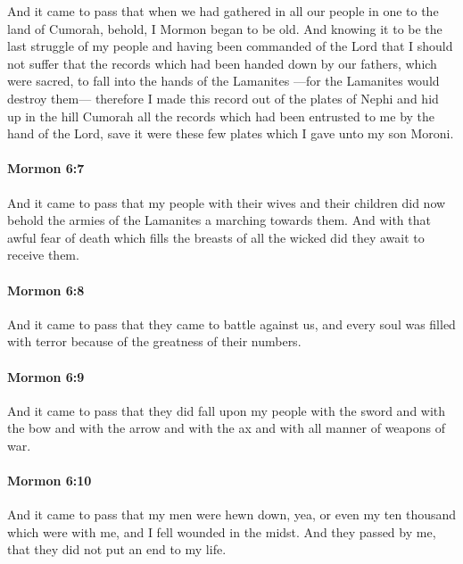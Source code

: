			And it came to pass that
			when we had gathered in all our people in one to the land of Cumorah,
			behold, I Mormon began to be old.
			And knowing it to be the last struggle of my people
			and having been commanded of the Lord
			that I should not suffer that the records
			which had been handed down by our fathers, which were sacred,
			to fall into the hands of the Lamanites
			---for the Lamanites would destroy them---
			therefore I made this record out of the plates of Nephi
			and hid up in the hill Cumorah all the records
			which had been entrusted to me by the hand of the Lord,
			save it were these few plates which I gave unto my son Moroni.

		\paragraph{Mormon 6:7} %
			\label{MORMON-6-7}

			And it came to pass that my people with their wives and their children
			did now behold the armies of the Lamanites a marching towards them.
			And with that awful fear of death which fills the breasts of all the wicked
			did they await to receive them.

		\paragraph{Mormon 6:8} %
			\label{MORMON-6-8}

			And it came to pass that they came to battle against us,
			and every soul was filled with terror
			because of the greatness of their numbers.

		\paragraph{Mormon 6:9} %
			\label{MORMON-6-9}

			And it came to pass that they did fall upon my people
			with the sword and with the bow and with the arrow and with the ax
			and with all manner of weapons of war.

		\paragraph{Mormon 6:10} %
			\label{MORMON-6-10}

			And it came to pass that my men were hewn down,
			yea, or even my ten thousand which were with me,
			and I fell wounded in the midst.
			And they passed by me,
			that they did not put an end to my life.

